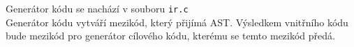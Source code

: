 \documentclass[../main.tex]{subfiles}
\begin{document}
Generátor kódu se nachází v souboru \texttt{ir.c}\\
Generátor kódu vytváří mezikód, který přijímá AST. Výsledkem vnitřního kódu bude mezikód pro generátor cílového kódu, kterému se temto mezikód předá.
\end{document}

